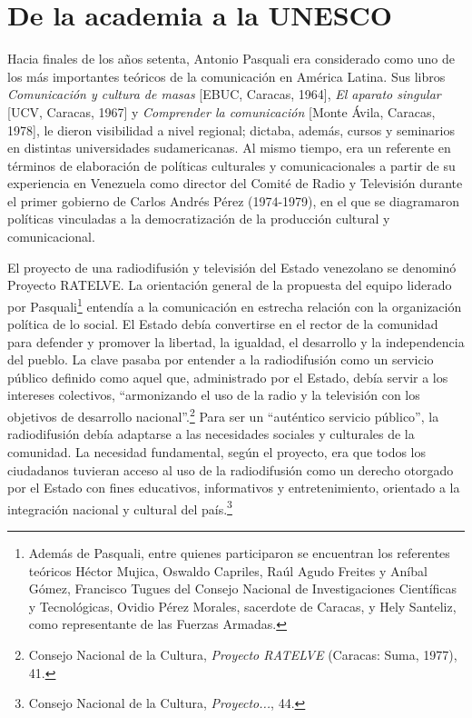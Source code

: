 \documentclass{tufte-handout}
\begin{document}
\hypertarget{de-la-academia-a-la-unesco}{%
\section{De la academia a la
UNESCO}\label{de-la-academia-a-la-unesco}}

Hacia finales de los años setenta, Antonio Pasquali era considerado como
uno de los más importantes teóricos de la comunicación en América
Latina. Sus libros \emph{Comunicación y cultura de masas} {[}EBUC,
Caracas, 1964{]}, \emph{El aparato singular} {[}UCV, Caracas, 1967{]} y
\emph{Comprender la comunicación} {[}Monte Ávila, Caracas, 1978{]}, le
dieron visibilidad a nivel regional; dictaba, además, cursos y
seminarios en distintas universidades sudamericanas. Al mismo tiempo,
era un referente en términos de elaboración de políticas culturales y
comunicacionales a partir de su experiencia en Venezuela como director
del Comité de Radio y Televisión durante el primer gobierno de Carlos
Andrés Pérez (1974-1979), en el que se diagramaron políticas vinculadas
a la democratización de la producción cultural y comunicacional.

El proyecto de una radiodifusión y televisión del Estado venezolano se
denominó Proyecto RATELVE. La orientación general de la propuesta del
equipo liderado por Pasquali\footnote{Además de Pasquali, entre quienes
  participaron se encuentran los referentes teóricos Héctor Mujica,
  Oswaldo Capriles, Raúl Agudo Freites y Aníbal Gómez, Francisco Tugues
  del Consejo Nacional de Investigaciones Científicas y Tecnológicas,
  Ovidio Pérez Morales, sacerdote de Caracas, y Hely Santeliz, como
  representante de las Fuerzas Armadas.} entendía a la comunicación en
estrecha relación con la organización política de lo social. El Estado
debía convertirse en el rector de la comunidad para defender y promover
la libertad, la igualdad, el desarrollo y la independencia del pueblo.
La clave pasaba por entender a la radiodifusión como un servicio público
definido como aquel que, administrado por el Estado, debía servir a los
intereses colectivos, ``armonizando el uso de la radio y la televisión
con los objetivos de desarrollo nacional''.\footnote{Consejo Nacional de
  la Cultura, \emph{Proyecto RATELVE} (Caracas: Suma, 1977), 41.} Para
ser un ``auténtico servicio público'', la radiodifusión debía adaptarse
a las necesidades sociales y culturales de la comunidad. La necesidad
fundamental, según el proyecto, era que todos los ciudadanos tuvieran
acceso al uso de la radiodifusión como un derecho otorgado por el Estado
con fines educativos, informativos y entretenimiento, orientado a la
integración nacional y cultural del país.\footnote{Consejo Nacional de
  la Cultura, \emph{Proyecto...}, 44.}
\end{document}
